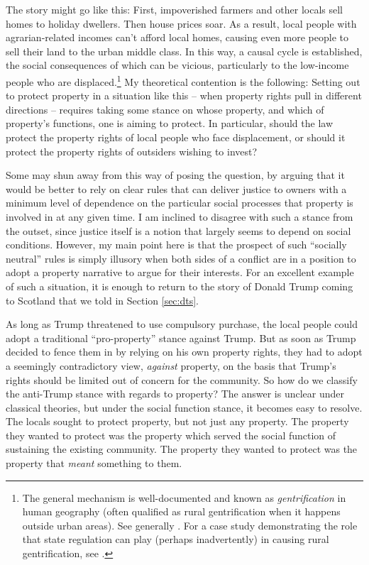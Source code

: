 The story might go like this: First, impoverished farmers and other locals sell homes to holiday dwellers. Then house prices soar. As a result, local people with agrarian-related incomes can't afford local homes, causing even more people to sell their land to the urban middle class. In this way, a causal cycle is established, the social consequences of which can be vicious, particularly to the low-income people who are displaced.\footnote{The general mechanism is well-documented and known as {\it gentrification} in human geography (often qualified as rural gentrification when it happens outside urban areas). See generally \cite{weesep94,phillips93,slater06}. For a case study demonstrating the role that state regulation can play (perhaps inadvertently) in causing rural gentrification, see \cite[1027-1030]{darling05}.} My theoretical contention is the following: Setting out to protect property in a situation like this -- when property rights pull in different directions -- requires taking some stance on whose property, and which of property's functions, one is aiming to protect. In particular, should the law protect the property rights of local people who face displacement, or should it protect the property rights of outsiders wishing to invest?

Some may shun away from this way of posing the question, by arguing that it would be better to rely on clear rules that can deliver justice to owners with a minimum level of dependence on the particular social processes that property is involved in at any given time. I am inclined to disagree with such a stance from the outset, since justice itself is a notion that largely seems to depend on social conditions. However, my main point here is that the prospect of such ``socially neutral'' rules is simply illusory when both sides of a conflict are in a position to adopt a property narrative to argue for their interests. For an excellent example of such a situation, it is enough to return to the story of Donald Trump coming to Scotland that we told in Section \ref{sec:dts}.

As long as Trump threatened to use compulsory purchase, the local people could adopt a traditional ``pro-property'' stance against Trump. But as soon as Trump decided to fence them in by relying on his own property rights, they had to adopt a seemingly contradictory view, {\it against} property, on the basis that Trump's rights should be limited out of concern for the community. So how do we classify the anti-Trump stance with regards to property? The answer is unclear under classical theories, but under the social function stance, it becomes easy to resolve. The locals sought to protect property, but not just any property. The property they wanted to protect was the property which served the social function of sustaining the existing community. The property they wanted to protect was the property that {\it meant} something to them.

